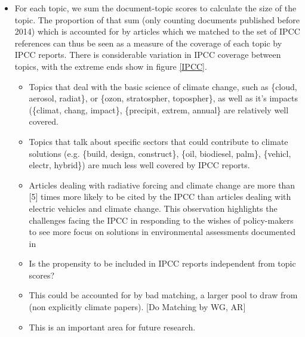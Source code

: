 \documentclass{article}
\begin{document}
\begin{itemize}
	\item For each topic, we sum the document-topic scores to calculate the size of the topic. The proportion of that sum (only counting documents published before 2014) which is accounted for by articles which we matched to the set of IPCC references can thus be seen as a measure of the coverage of each topic by IPCC reports. There is considerable variation in IPCC coverage between topics, with the extreme ends show in figure \ref{IPCC}.
	\begin{itemize}
    	\item Topics that deal with the basic science of climate change, such as \{cloud, aerosol, radiat\}, or \{ozon, stratospher, topospher\}, as well as it's impacts (\{climat, chang, impact\}, \{precipit, extrem, annual\} are relatively well covered.
        \item Topics that talk about specific sectors that could contribute to climate solutions (e.g. \{build, design, construct\}, \{oil, biodiesel, palm\}, \{vehicl, electr, hybrid\}) are much less well covered by IPCC reports. 
        \item Articles dealing with radiative forcing and climate change are more than [5] times more likely to be cited by the IPCC than articles dealing with electric vehicles and climate change. This observation highlights the challenges facing the IPCC in responding to the wishes of policy-makers to see more focus on solutions in environmental assessments documented in \citet{Kowarsch2017}
		\item Is the propensity to be included in IPCC reports independent from topic scores?
		\item This could be accounted for by bad matching, a larger pool to draw from (non explicitly climate papers).  [Do Matching by WG, AR]
		\item This is an important area for future research.
	\end{itemize}
\end{itemize}
\end{document}
